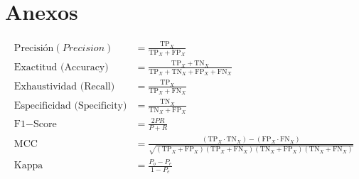 \documentclass[IB]{TFUOC}
\begin{document}
\newpage

\printunsrtglossary[type=acronym, title={Lista de acrónimos}]

\vspace{1cm}

\printunsrtglossary[title={Glosario de términos}]

\clearpage
{}
{}

\chapter*{Anexos}

\begin{align*}
  \text{Precisión}(Precision)        & = \frac{\text{TP}_X}{\text{TP}_X + \text{FP}_X}                                                                                                                                                 \\[1.5em]
  \text{Exactitud (Accuracy)}        & = \frac{\text{TP}_X + \text{TN}_X}{\text{TP}_X + \text{TN}_X + \text{FP}_X + \text{FN}_X}                                                                                                       \\[1.5em]
  \text{Exhaustividad (Recall)}      & = \frac{\text{TP}_X}{\text{TP}_X + \text{FN}_X}                                                                                                                                                 \\[1.5em]
  \text{Especificidad (Specificity)} & = \frac{\text{TN}_X}{\text{TN}_X + \text{FP}_X}                                                                                                                                                 \\[1.5em]
  \text{F1}-\text{Score}             & = \frac{2PR}{P + R}                                                                                                                                                                             \\[1.5em]
  \text{MCC}                         & = \frac{(\text{TP}_X \cdot \text{TN}_X) - (\text{FP}_X \cdot \text{FN}_X)}{\sqrt{(\text{TP}_X + \text{FP}_X)(\text{TP}_X + \text{FN}_X)(\text{TN}_X + \text{FP}_X)(\text{TN}_X + \text{FN}_X)}} \\[1.5em]
  \text{Kappa}                       & = \frac{P_o - P_e}{1 - P_e}
\end{align*}
\end{document}
